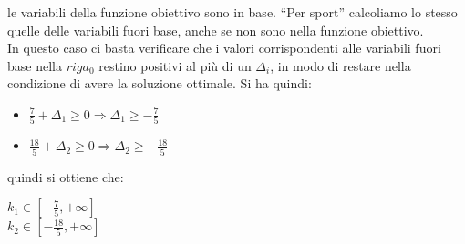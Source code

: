 \documentclass[a4paper,12pt, oneside]{book}
\begin{document}
\begin{itemize}
{  le variabili della funzione obiettivo sono in base. ``Per sport''
  calcoliamo lo stesso quelle delle variabili fuori base, anche se non
  sono nella funzione obiettivo}. \\
  In questo caso ci basta verificare che i valori corrispondenti alle
  variabili fuori base nella $riga_0$ restino positivi al più di un
  $\Delta_i$, in modo di restare nella condizione di avere la
  soluzione ottimale. Si ha quindi:
  \begin{itemize}
    \item $\frac{7}{5}+\Delta_1\geq 0\Longrightarrow \Delta_1\geq -\frac{7}{5}$
    \item $\frac{18}{5}+\Delta_2\geq 0\Longrightarrow \Delta_2\geq -\frac{18}{5}$
  \end{itemize}
  quindi si ottiene che:
  \begin{shaded}
    $k_1\in[-\frac{7}{5}, +\infty]$\\
    $k_2\in[-\frac{18}{5}, +\infty]$
  \end{shaded}
\end{itemize}
\end{document}
